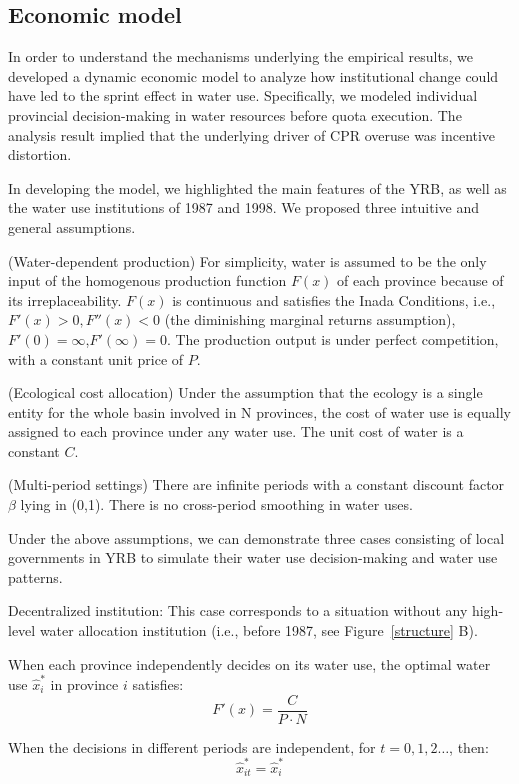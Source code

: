 \subsection{Economic model}
In order to understand the mechanisms underlying the empirical results, we developed a dynamic economic model to analyze how institutional change could have led to the sprint effect in water use. Specifically, we modeled individual provincial decision-making in water resources before quota execution. The analysis result implied that the underlying driver of CPR overuse was incentive distortion.

In developing the model, we highlighted the main features of the YRB, as well as the water use institutions of 1987 and 1998. We proposed three intuitive and general assumptions.

\begin{ass}
    (Water-dependent production) For simplicity, water is assumed to be the only input of the homogenous production function $F(x)$ of each province because of its irreplaceability. $F(x)$ is continuous and satisfies the Inada Conditions, i.e., $F'(x)>0, F''(x)<0$ (the diminishing marginal returns assumption), $F'(0)=\infty$,$ F'(\infty)=0$. The production output is under perfect competition, with a constant unit price of $P$.
\end{ass}
\begin{ass}
    (Ecological cost allocation) Under the assumption that the ecology is a single entity for the whole basin involved in N provinces, the cost of water use is equally assigned to each province under any water use. The unit cost of water is a constant $C$.
\end{ass}
\begin{ass}
    (Multi-period settings) There are infinite periods with a constant discount factor $\beta$ lying in (0,1). There is no cross-period smoothing in water uses.
\end{ass}

Under the above assumptions, we can demonstrate three cases consisting of local governments in YRB to simulate their water use decision-making and water use patterns.

\begin{case} Decentralized institution:
    This case corresponds to a situation without any high-level water allocation institution (i.e., before 1987, see Figure~\ref{structure} B).

    When each province independently decides on its water use, the optimal water use $\hat x_i^*$ in province $i$ satisfies:
    $$F'(x)=\frac{C}{P \cdot N}$$

    When the decisions in different periods are independent, for $t=0,1,2 \ldots$, then:
    $$\hat x_{it}^*=\hat x_i^*$$

\end{case}

